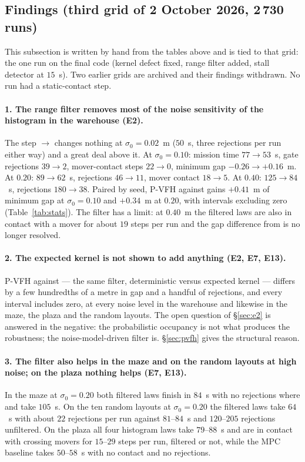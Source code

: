 \subsection{Findings (third grid of 2 October 2026, 2\,730 runs)}
\label{sec:findings}

This subsection is written by hand from the tables above and is tied to
that grid: the one run on the final code (kernel defect fixed, range
filter added, stall detector at $15$~s). Two earlier grids are archived
and their findings withdrawn. No run had a static-contact step.

\paragraph{1. The range filter removes most of the noise sensitivity of
the histogram in the warehouse (E2).} The step  $\to$
 changes nothing at $\sigma_0 = 0.02$~m ($50$~s, three
rejections per run either way) and a great deal above it. At
$\sigma_0 = 0.10$: mission time $77 \to 53$~s, gate rejections
$39 \to 2$, mover-contact steps $22 \to 0$, minimum gap $-0.26 \to
+0.16$~m. At $0.20$: $89 \to 62$~s, rejections $46 \to 11$, mover contact
$18 \to 5$. At $0.40$: $125 \to 84$~s, rejections $180 \to 38$. Paired by
seed, P-VFH against  gains $+0.41$~m of minimum gap at
$\sigma_0 = 0.10$ and $+0.34$~m at $0.20$, with intervals excluding zero
(Table~\ref{tab:stats}). The filter has a limit: at $0.40$~m the filtered
laws are also in contact with a mover for about $19$ steps per run and
the gap difference from  is no longer resolved.

\paragraph{2. The expected kernel is not shown to add anything (E2, E7,
E13).} P-VFH against  --- the same filter, deterministic
versus expected kernel --- differs by a few hundredths of a metre in gap
and a handful of rejections, and every interval includes zero, at every
noise level in the warehouse and likewise in the maze, the plaza and the
random layouts. The open question of \S\ref{sec:e2} is answered in the
negative: the probabilistic occupancy is not what produces the
robustness; the noise-model-driven filter is. \S\ref{sec:pvfh} gives the
structural reason.

\paragraph{3. The filter also helps in the maze and on the random
layouts at high noise; on the plaza nothing helps (E7, E13).} In the maze
at $\sigma_0 = 0.20$ both filtered laws finish in $84$~s with no
rejections where  and  take $105$~s. On the ten
random layouts at $\sigma_0 = 0.20$ the filtered laws take $64$~s with
about $22$ rejections per run against $81$--$84$~s and $120$--$205$
rejections unfiltered. On the plaza all four histogram laws take
$79$--$88$~s and are in contact with crossing movers for $15$--$29$ steps
per run, filtered or not, while the MPC baseline takes $50$--$58$~s with
no contact and no rejections.

